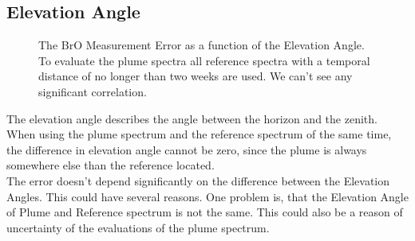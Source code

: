 \documentclass  [
  paper    = a4,
  BCOR     = 10mm,
  twoside,
  fontsize = 12pt,
  fleqn,
  toc      = bibnumbered,
  toc      = listofnumbered,
  numbers  = noendperiod,
  headings = normal,
  listof   = leveldown,
  version  = 3.03
]                                       {scrreprt}
\begin{document}
	\subsection{Elevation Angle}
		\begin{figure}[h!]			
		\caption{The BrO Measurement Error as a function of the Elevation Angle. To evaluate the plume spectra all reference spectra with a temporal distance of no longer than two weeks are used. We can't see any significant correlation.}
	\end{figure}
	The elevation angle describes the angle between the horizon and the zenith. When using the plume spectrum and the reference spectrum of the same time, the difference in elevation angle cannot be zero, since the plume is always somewhere else than the reference located.\\
	The  error doesn't depend significantly on the difference between the Elevation Angles. This could have several reasons. One problem is, that the Elevation Angle of Plume and Reference spectrum is not the same. This could also be a reason of uncertainty of the evaluations of the plume spectrum.
\end{document}
